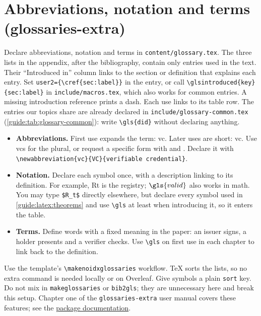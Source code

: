 \section{Abbreviations, notation and terms (glossaries-extra)}\label{guide:latex:acro}
Declare abbreviations, notation and terms in \texttt{content/glossary.tex}. The three lists in the appendix, after the bibliography, contain only entries used in the text. Their \enquote{Introduced in} column links to the section or definition that explains each entry. Set \texttt{user2=\{\textbackslash cref\{sec:label\}\}} in the entry, or call \texttt{\textbackslash glsintroduced\{key\}\{sec:label\}} in \texttt{include/macros.tex}, which also works for common entries. A missing introduction reference prints a dash. Each use links to its table row. The entries our topics share are already declared in \texttt{include/glossary-common.tex} (\cref{guide:tab:glossary-common}): write \texttt{\textbackslash gls\{did\}} without declaring anything.
\begin{itemize}[noitemsep]
  \item \textbf{Abbreviations.} First use expands the term: \gls{vc}. Later uses are short: \gls{vc}. Use \glspl{vc} for the plural, or request a specific form with  and . Declare it with \texttt{\textbackslash newabbreviation\{vc\}\{VC\}\{verifiable credential\}}.
  \item \textbf{Notation.} Declare each symbol once, with a description linking to its definition. For example, \gls{Rt} is the registry; $\gls{valid}$ also works in math. You may type \texttt{\$R\_t\$} directly elsewhere, but declare every symbol used in \cref{guide:latex:theorems} and use \texttt{\textbackslash gls} at least when introducing it, so it enters the table.
  \item \textbf{Terms.} Define words with a fixed meaning in the paper: an \gls{issuer} signs, a \gls{holder} presents and a \gls{verifier} checks. Use \texttt{\textbackslash gls} on first use in each chapter to link back to the definition.
\end{itemize}
Use the template's \texttt{\textbackslash makenoidxglossaries} workflow. TeX sorts the lists, so no extra command is needed locally or on Overleaf. Give symbols a plain \texttt{sort} key. Do not mix in \texttt{makeglossaries} or \texttt{bib2gls}; they are unnecessary here and break this setup. Chapter one of the \texttt{glossaries-extra} user manual covers these features; see the \href{https://ctan.org/pkg/glossaries-extra}{package documentation}.

